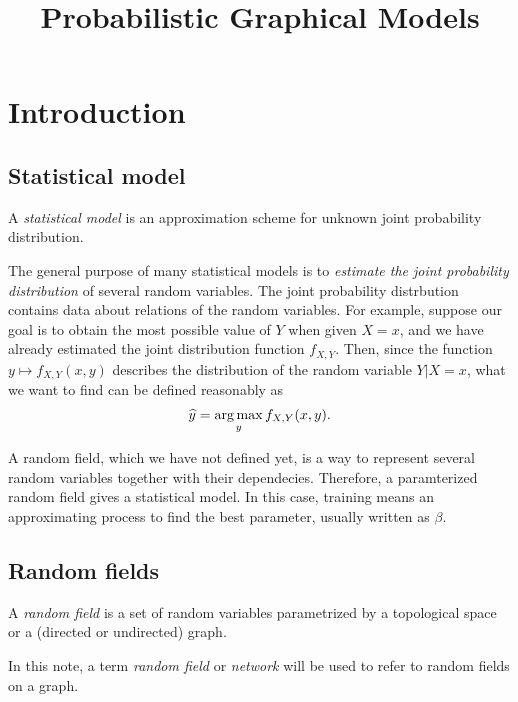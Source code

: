 \documentclass{../exp}
\title{Probabilistic Graphical Models}
\begin{document}
\maketitle
\tableofcontents




\section{Introduction}

\subsection{Statistical model}
\begin{defn}
A \emph{statistical model} is an approximation scheme for unknown joint probability distribution.
\end{defn}
The general purpose of many statistical models is to \emph{estimate the joint probability distribution} of several random variables.
The joint probability distrbution contains data about relations of the random variables.
For example, suppose our goal is to obtain the most possible value of $Y$ when given $X=x$, and we have already estimated the joint distribution function $f_{X,Y}$.
Then, since the function $y\mapsto f_{X,Y}(x,y)$ describes the distribution of the random variable $Y|X=x$, what we want to find can be defined reasonably as
\[\widehat y=\operatorname*{arg\,max}_yf_{X,Y}(x,y).\]

\begin{ex}
A random field, which we have not defined yet, is a way to represent several random variables together with their dependecies.
Therefore, a paramterized random field gives a statistical model.
In this case, training means an approximating process to find the best parameter, usually written as $\beta$.
\end{ex}

\subsection{Random fields}
\begin{defn}
A \emph{random field} is a set of random variables parametrized by a topological space or a (directed or undirected) graph.
\end{defn}
\begin{defn}
In this note, a term \emph{random field} or \emph{network} will be used to refer to random fields on a graph.
\end{defn}
\end{document}
